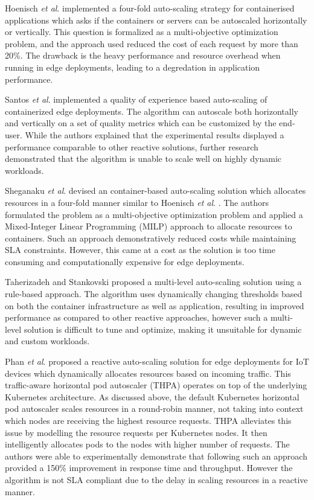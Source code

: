 Hoenisch \textit{et al}. \cite{hoenisch2015four} implemented a four-fold auto-scaling strategy for containerised applications which asks if the containers or servers can be autoscaled horizontally or vertically. This question is formalized as a multi-objective optimization problem, and the approach used reduced the cost of each request by more than 20\%. The drawback is the heavy performance and resource overhead when running in edge deployments, leading to a degredation in application performance.\par

Santos \textit{et al}. \cite{santos2020qoe} implemented a quality of experience based auto-scaling of containerized edge deployments. The algorithm can autoscale both horizontally and vertically on a set of quality metrics which can be customized by the end-user. While the authors explained that the experimental results displayed a performance comparable to other reactive solutions, further research demonstrated that the algorithm is unable to scale well on highly dynamic workloads.\par

Sheganaku \textit{et al}. \cite{sheganaku2023cost} devised an container-based auto-scaling solution which allocates resources in a four-fold manner similar to Hoenisch \textit{et al}. \cite{hoenisch2015four}. The authors formulated the problem as a multi-objective optimization problem and applied a Mixed-Integer Linear Programming (MILP) approach to allocate resources to containers. Such an approach demonstratively reduced costs while maintaining SLA constraints. However, this came at a cost as the solution is too time consuming and computationally expensive for edge deployments.\par

Taherizadeh and Stankovski \cite{taherizadeh2019dynamic} proposed a multi-level auto-scaling solution using a rule-based approach. The algorithm uses dynamically changing thresholds based on both the container infrastructure as well as application, resulting in improved performance as compared to other reactive approaches, however such a multi-level solution is difficult to tune and optimize, making it unsuitable for dynamic and custom workloads.\par

Phan \textit{et al}. \cite{phan2022traffic} proposed a reactive auto-scaling solution for edge deployments for IoT devices which dynamically allocates resources based on incoming traffic. This traffic-aware horizontal pod autoscaler (THPA) operates on top of the underlying Kubernetes architecture. As discussed above, the default Kubernetes horizontal pod autoscaler scales resources in a round-robin manner, not taking into context which nodes are receiving the highest resource requests. THPA alleviates this issue by modelling the resource requests per Kubernetes nodes. It then intelligently allocates pods to the nodes with higher number of requests. The authors were able to experimentally demonstrate that following such an approach provided a 150\% improvement in response time and throughput. However the algorithm is not SLA compliant due to the delay in scaling resources in a reactive manner.

